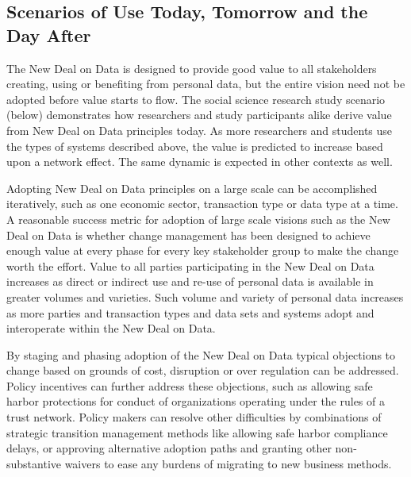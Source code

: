  \subsection{Scenarios of Use Today, Tomorrow and the Day After}


The New Deal on Data is designed to provide good value to all stakeholders creating, using or benefiting from personal data, but the entire vision need not be adopted before value starts to flow. The social science research study scenario (below) demonstrates how researchers and study participants alike derive value from New Deal on Data principles today.  As more researchers and students use the types of systems described above, the value is predicted to increase based upon a network effect.  The same dynamic is expected in other contexts as well. 

Adopting New Deal on Data principles on a large scale can be accomplished iteratively, such as one economic sector, transaction type or data type at a time.  A reasonable success metric for adoption of large scale visions such as the New Deal on Data is whether change management has been designed to achieve enough value at every phase for every key stakeholder group to make the change worth the effort.  Value to all parties participating in the New Deal on Data increases as direct or indirect use and re-use of personal data is available in greater volumes and varieties.  Such volume and variety of personal data increases as more parties and transaction types and data sets and systems adopt and interoperate within the New Deal on Data.    

By staging and phasing adoption of the New Deal on Data typical objections to change based on grounds of cost, disruption or over regulation can be addressed.
Policy incentives can further address these objections, such as allowing safe harbor protections for conduct of organizations operating under the rules of a trust network.
Policy makers can resolve other difficulties by combinations of strategic transition management methods like allowing safe harbor compliance delays, or approving alternative adoption paths and granting other non-substantive waivers to ease any burdens of migrating to new business methods.   
 
